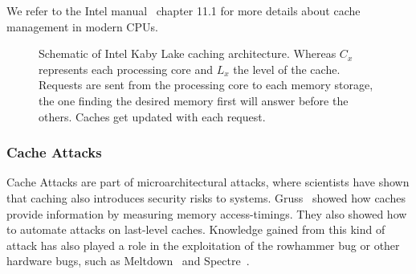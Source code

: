 We refer to the Intel manual~\cite{intelsys} chapter 11.1 for more details about
cache management in modern CPUs.

\begin{figure}
  \centering
  \caption{Schematic of Intel Kaby Lake caching architecture. Whereas $C_x$
represents each processing core and $L_x$ the level of the cache. Requests are
sent from the processing core to each memory storage, the one finding the
desired memory first will answer before the others. Caches get updated with
each request.} \label{fig:intelcache}
\end{figure}

\subsubsection{Cache Attacks}

Cache Attacks are part of microarchitectural attacks, where scientists have
shown that caching also introduces security risks to systems.
Gruss~\etal\cite{gruss2015cache} showed how caches provide information by
measuring memory access-timings. They also showed how to automate attacks on
last-level caches. Knowledge gained from this kind of attack has also played
a role in the exploitation of the rowhammer bug or other hardware bugs, such as
Meltdown~\cite{meltdown} and Spectre~\cite{spectre}.

